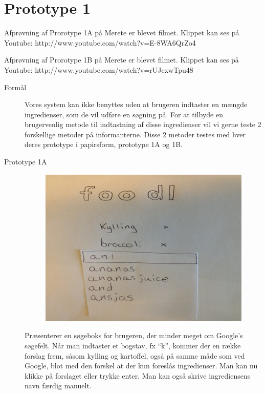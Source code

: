 \section{Prototype 1}

Afprøvning af Prorotype 1A på Merete er blevet filmet. Klippet kan ses på Youtube: http://www.youtube.com/watch?v=E-8WA6QrZo4

Afprøvning af Prorotype 1B på Merete er blevet filmet. Klippet kan ses på Youtube: http://www.youtube.com/watch?v=rUJexwTpu48

\begin{description}
\item[Formål] Vores system kan ikke benyttes uden at brugeren indtaster en mængde ingredienser, som de vil udføre en søgning på. For at tilbyde en brugervenlig metode til indtastning af disse ingredienser vil vi gerne teste 2 forskellige metoder på informanterne. Disse 2 metoder testes med hver deres prototype i papirsform, prototype 1A og 1B.
\item[Prototype 1A]

\begin{figure}[H]
\centering
\includegraphics[scale=0.7]{billeder/prototyper/prototype1a.png}
\label{fig:prototype1a}
\end{figure}

Præsenterer en søgeboks for brugeren, der minder meget om Google’s søgefelt. Når man indtaster et bogstav, fx “k”, kommer der en række forslag frem, såsom kylling og kartoffel, også på samme måde som ved Google, blot med den forskel at der kun foreslås ingredienser. Man kan nu klikke på forslaget eller trykke enter. Man kan også skrive ingrediensens navn færdig manuelt.


\end{description}
